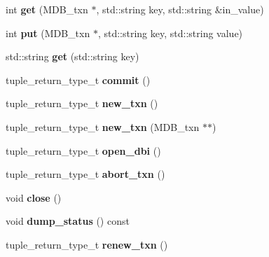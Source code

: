 \begin{DoxyCompactItemize}
\item 
\mbox{\label{structmods_1_1lmdb_1_1__db__handle_a174aba1966475e1d8074796019c84a7e}} 
int {\bfseries get} (M\+D\+B\+\_\+txn $\ast$, std\+::string key, std\+::string \&in\+\_\+value)
\item 
\mbox{\label{structmods_1_1lmdb_1_1__db__handle_aaa29ba2dfeaff18c62ac5b7dc736677f}} 
int {\bfseries put} (M\+D\+B\+\_\+txn $\ast$, std\+::string key, std\+::string value)
\item 
\mbox{\label{structmods_1_1lmdb_1_1__db__handle_a55bcadafaf012aeb3dcef782eb0d782c}} 
std\+::string {\bfseries get} (std\+::string key)
\item 
\mbox{\label{structmods_1_1lmdb_1_1__db__handle_accce5da22ddddad187ca266cab1740e7}} 
tuple\+\_\+return\+\_\+type\+\_\+t {\bfseries commit} ()
\item 
\mbox{\label{structmods_1_1lmdb_1_1__db__handle_a2bed96ee84f6d91bb6bbb0cba95aef0e}} 
tuple\+\_\+return\+\_\+type\+\_\+t {\bfseries new\+\_\+txn} ()
\item 
\mbox{\label{structmods_1_1lmdb_1_1__db__handle_aa3cd410c05c781f763072da6ad3a3a97}} 
tuple\+\_\+return\+\_\+type\+\_\+t {\bfseries new\+\_\+txn} (M\+D\+B\+\_\+txn $\ast$$\ast$)
\item 
\mbox{\label{structmods_1_1lmdb_1_1__db__handle_af4d870ecebe05e17ce680dc9058e6aa2}} 
tuple\+\_\+return\+\_\+type\+\_\+t {\bfseries open\+\_\+dbi} ()
\item 
\mbox{\label{structmods_1_1lmdb_1_1__db__handle_a7d3cb6143fb5e400319d8f42826d5661}} 
tuple\+\_\+return\+\_\+type\+\_\+t {\bfseries abort\+\_\+txn} ()
\item 
\mbox{\label{structmods_1_1lmdb_1_1__db__handle_a42ebed3ed5afb3673b97f424fc003179}} 
void {\bfseries close} ()
\item 
\mbox{\label{structmods_1_1lmdb_1_1__db__handle_a4eeaec221b54aafb0ecf7f67fe5baf82}} 
void {\bfseries dump\+\_\+status} () const
\item 
\mbox{\label{structmods_1_1lmdb_1_1__db__handle_a93d43cfa607ecd743bcba325e658e9c6}} 
tuple\+\_\+return\+\_\+type\+\_\+t {\bfseries renew\+\_\+txn} ()
\end{DoxyCompactItemize}
